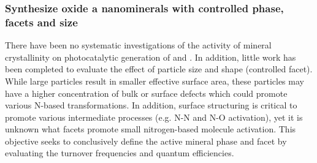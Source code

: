 \vspace{1mm}
\subsubsection{Synthesize oxide a nanominerals with controlled phase, facets and size}
\label{sec:SA1_1}
\vspace{1mm}

There have been no systematic investigations of the activity of mineral crystallinity on photocatalytic generation of \NO\hspace{1mm} and \NH. In addition, little work has been completed to evaluate the effect of particle size and shape (controlled facet). While large particles result in smaller effective surface area, these particles may have a higher concentration of bulk or surface defects which could promote various N-based transformations. In addition, surface structuring is critical to promote various intermediate processes (e.g. N-N and N-O activation), yet it is unknown what facets promote small nitrogen-based molecule activation. This objective seeks to conclusively define the active mineral phase and facet by evaluating the  turnover frequencies and quantum efficiencies.


